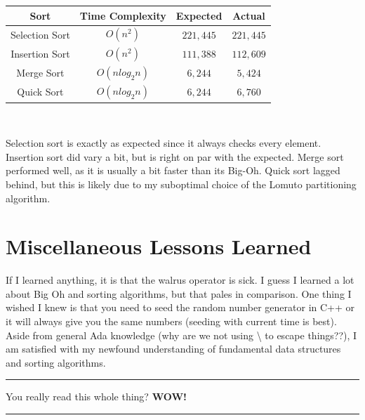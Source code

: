 \documentclass[letterpaper, 10pt]{article}
\begin{document}
\begin{center}
\begin{tabular}{||c c c c||} 
 \hline
 Sort & Time Complexity & Expected & Actual\\ [0.5ex] 
 \hline\hline
 Selection Sort & \( O(n^2)\) & \(221,445\) & \(221,445\) \\
 \hline
 Insertion Sort & \( O(n^2)\) & \(111,388\) & \(112,609\) \\
 \hline
 Merge Sort & \( O(nlog_2n)\) & \(6,244\) & \(5,424\) \\
 \hline
 Quick Sort & \( O(nlog_2n)\) & \(6,244\) & \(6,760\) \\
 \hline
\end{tabular}
\\

\end{center}
Selection sort is exactly as expected since it always checks every element. Insertion sort did vary a bit, but is right on par with the expected. Merge sort performed well, as it is usually a bit faster than its Big-Oh. Quick sort lagged behind, but this is likely due to my suboptimal choice of the Lomuto partitioning algorithm.

\section{Miscellaneous Lessons Learned}
If I learned anything, it is that the walrus operator is sick. I guess I learned a lot about Big Oh and sorting algorithms, but that pales in comparison. One thing I wished I knew is that you need to seed the random number generator in C++ or it will always give you the same numbers (seeding with current time is best). Aside from general Ada knowledge (why are we not using \textbackslash{} to escape things??), I am satisfied with my newfound understanding of fundamental data structures and sorting algorithms. 
\newline
\hrule
\vspace{.25cm}
You really read this whole thing? \textbf{WOW!}
\vspace{.25cm}
\hrule
\end{document}
